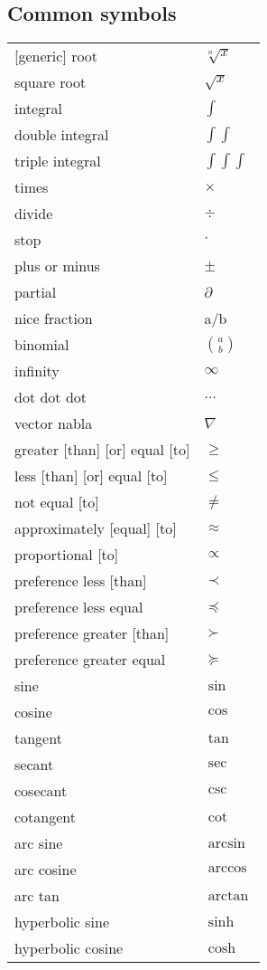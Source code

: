 \documentclass[12pt]{article}
\begin{document}
\subsection{Common symbols}
\noindent
\begin{longtable}{ l l}
[generic] root & $\sqrt[n]{x}$ \\
square root & $\sqrt{x}$ \\
integral & $\int$ \\
double integral & $\int \int$ \\
triple integral & $\int \int \int$ \\
times & $\times$ \\
divide & $\div$ \\
stop & $\cdot$ \\
plus or minus & $\pm$ \\
partial & $\partial$ \\
nice fraction & a/b \\
binomial & ${a \choose b}$ \\
infinity & $\infty$ \\
dot dot dot & $\dots$ \\
vector nabla & $\nabla$ \\
greater [than] [or] equal [to] & $\geq$ \\
less [than] [or] equal [to] & $\leq$ \\
not equal [to] & $\neq$ \\
approximately [equal] [to] & $\approx$ \\
proportional [to] & $\propto$ \\
preference less [than] & $\prec$ \\
preference less equal & $\preceq$ \\
preference greater [than] & $\succ$ \\
preference greater equal & $\succeq$ \\
sine & $\sin$ \\
cosine & $\cos$ \\
tangent & $\tan$ \\
secant & $\sec$ \\
cosecant & $\csc$ \\
cotangent & $\cot$ \\
arc sine & $\arcsin$ \\
arc cosine & $\arccos$ \\
arc tan & $\arctan$ \\
hyperbolic sine & $\sinh$ \\
hyperbolic cosine & $\cosh$ \\

\end{longtable}
\end{document}
